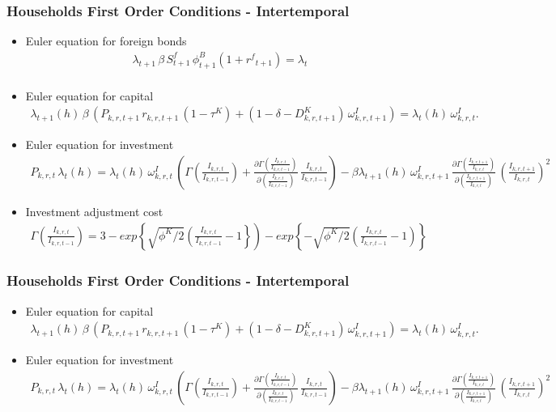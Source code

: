 \documentclass[11pt,aspectratio=169]{beamer}
\begin{document}
\begin{frame}
\frametitle{Households First Order Conditions - Intertemporal}
\scriptsize
\begin{itemize}
\item Euler equation for foreign bonds
\begin{align*}
\lambda_{t+1} \, \beta \, S^{f}_{t+1} \, \phi^{B}_{t+1} \left(1+{{r^{f}}_{t+1}}\right) = \lambda_{t} \\
\end{align*}
\item Euler equation for capital
\begin{align*}
\lambda_{t+1}(h) \, \beta \, \left(P_{k,r,t+1} \, r_{k,r,t+1} \, (1 - \tau^K) + (1 - \delta - D^{K}_{k,r,t+1}) \, \omega^{I}_{k,r,t+1} \right) = \lambda_{t}(h) \, \omega^{I}_{k,r,t}.
\end{align*}
\item Euler equation for investment
\begin{align*}
P_{k,r,t} \, \lambda_{t}(h) = \lambda_{t}(h) \, \omega^{I}_{k,r,t} \, \left(\Gamma(\frac{I_{k,r,t}}{I_{k,r,t-1}}) + \frac{\partial \Gamma(\frac{I_{k,r,t}}{I_{k,r,t-1}})}{\partial (\frac{I_{k,r,t}}{I_{k,r,t-1}})} \, \frac{I_{k,r,t}}{I_{k,r,t-1}} \right) - \beta \lambda_{t+1}(h) \, \omega^{I}_{k,r,t+1} \, \frac{\partial \Gamma(\frac{I_{k,r,t+1}}{I_{k,r,t}})}{\partial (\frac{I_{k,r,t+1}}{I_{k,r,t}})} \, \left(\frac{I_{k,r,t+1}}{I_{k,r,t}}\right)^2
\end{align*}
\item Investment adjustment cost
\begin{align*}
\Gamma(\frac{I_{k,r,t}}{I_{k,r,t-1}}) = 3 - exp\left\lbrace\sqrt{\phi^{K}/2}\left(\frac{I_{k,r,t}}{I_{k,r,t-1}}-1\right\rbrace\right) - exp\left\lbrace-\sqrt{\phi^{K}/2}\left(\frac{I_{k,r,t}}{I_{k,r,t-1}}-1\right)\right\rbrace
\end{align*}
\end{itemize}
\end{frame}

\begin{frame}
\frametitle{Households First Order Conditions - Intertemporal}
\scriptsize
\begin{itemize}
\item Euler equation for capital
\begin{align*}
\lambda_{t+1}(h) \, \beta \, \left(P_{k,r,t+1} \, r_{k,r,t+1} \, (1 - \tau^K) + (1 - \delta - D^{K}_{k,r,t+1}) \, \omega^{I}_{k,r,t+1} \right) = \lambda_{t}(h) \, \omega^{I}_{k,r,t}.
\end{align*}
\item Euler equation for investment
\begin{align*}
P_{k,r,t} \, \lambda_{t}(h) = \lambda_{t}(h) \, \omega^{I}_{k,r,t} \, \left(\Gamma(\frac{I_{k,r,t}}{I_{k,r,t-1}}) + \frac{\partial \Gamma(\frac{I_{k,r,t}}{I_{k,r,t-1}})}{\partial (\frac{I_{k,r,t}}{I_{k,r,t-1}})} \, \frac{I_{k,r,t}}{I_{k,r,t-1}} \right) - \beta \lambda_{t+1}(h) \, \omega^{I}_{k,r,t+1} \, \frac{\partial \Gamma(\frac{I_{k,r,t+1}}{I_{k,r,t}})}{\partial (\frac{I_{k,r,t+1}}{I_{k,r,t}})} \, \left(\frac{I_{k,r,t+1}}{I_{k,r,t}}\right)^2
\end{align*}
\end{itemize}
\end{frame}
\end{document}
